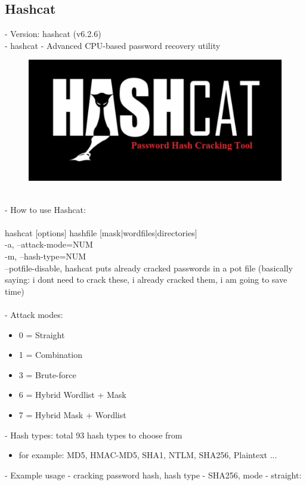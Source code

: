 \documentclass[10pt,oneside,english,a4paper]{article}
\begin{document}
\pagebreak
\subsection{Hashcat}
- Version: hashcat (v6.2.6) \\
- hashcat - Advanced CPU-based password recovery utility
\begin{figure}[h]
	\centering
	\includegraphics[scale = 0.10]{Hashcat.png}
\end{figure}\\
- How to use Hashcat:\\\\
hashcat [options] hashfile [mask|wordfiles|directories]\\
-a, --attack-mode=NUM\\
-m, --hash-type=NUM\\
--potfile-disable, hashcat puts already cracked passwords in a pot file (basically saying: i dont need to crack these, i already cracked them, i am going to save time)\\\\
- Attack modes:
\begin{itemize}
	\item 0 = Straight
	\item 1 = Combination
	\item 3 = Brute-force
	\item 6 = Hybrid Wordlist + Mask
	\item 7 = Hybrid Mask + Wordlist
\end{itemize}
- Hash types: total 93 hash types to choose from
\begin{itemize}
	\item for example: MD5, HMAC-MD5, SHA1, NTLM, SHA256, Plaintext ...
\end{itemize}
- Example usage - cracking password hash, hash type - SHA256, mode - straight:
\end{document}
